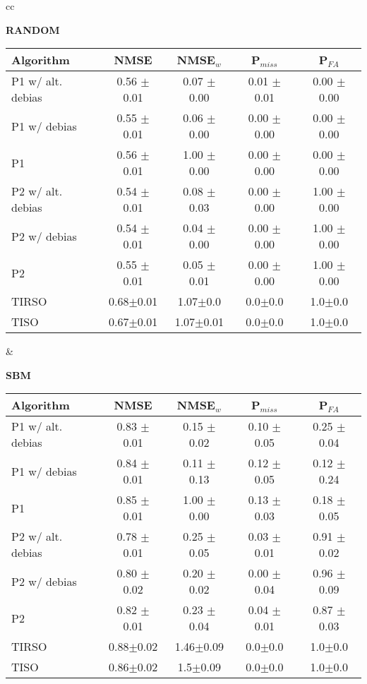 \begin{table}[htbp]
\begin{tabular}{cc}
\begin{minipage}{0.48\textwidth}
\centering
\textbf{RANDOM}
\begin{tabular}{lcccc}
\toprule
Algorithm & NMSE & NMSE$_w$ & P$_{miss}$ & P$_{FA}$ \\
\midrule
P1 w/ alt. debias & 0.56 $\pm$ 0.01 & 0.07 $\pm$ 0.00 & 0.01 $\pm$ 0.01 & 0.00 $\pm$ 0.00 \\
P1 w/ debias & 0.55 $\pm$ 0.01 & 0.06 $\pm$ 0.00 & 0.00 $\pm$ 0.00 & 0.00 $\pm$ 0.00 \\
P1 & 0.56 $\pm$ 0.01 & 1.00 $\pm$ 0.00 & 0.00 $\pm$ 0.00 & 0.00 $\pm$ 0.00 \\
P2 w/ alt. debias & 0.54 $\pm$ 0.01 & 0.08 $\pm$ 0.03 & 0.00 $\pm$ 0.00 & 1.00 $\pm$ 0.00 \\
P2 w/ debias & 0.54 $\pm$ 0.01 & 0.04 $\pm$ 0.00 & 0.00 $\pm$ 0.00 & 1.00 $\pm$ 0.00 \\
P2 & 0.55 $\pm$ 0.01 & 0.05 $\pm$ 0.01 & 0.00 $\pm$ 0.00 & 1.00 $\pm$ 0.00 \\
TIRSO & 0.68{\tiny$\pm$0.01} & 1.07{\tiny$\pm$0.0} & 0.0{\tiny$\pm$0.0} & 1.0{\tiny$\pm$0.0} \\
TISO & 0.67{\tiny$\pm$0.01} & 1.07{\tiny$\pm$0.01} & 0.0{\tiny$\pm$0.0} & 1.0{\tiny$\pm$0.0} \\
\bottomrule
\end{tabular}
\end{minipage}
&
\begin{minipage}{0.48\textwidth}
\centering
\textbf{SBM}
\begin{tabular}{lcccc}
\toprule
Algorithm & NMSE & NMSE$_w$ & P$_{miss}$ & P$_{FA}$ \\
\midrule
P1 w/ alt. debias & 0.83 $\pm$ 0.01 & 0.15 $\pm$ 0.02 & 0.10 $\pm$ 0.05 & 0.25 $\pm$ 0.04 \\
P1 w/ debias & 0.84 $\pm$ 0.01 & 0.11 $\pm$ 0.13 & 0.12 $\pm$ 0.05 & 0.12 $\pm$ 0.24 \\
P1 & 0.85 $\pm$ 0.01 & 1.00 $\pm$ 0.00 & 0.13 $\pm$ 0.03 & 0.18 $\pm$ 0.05 \\
P2 w/ alt. debias & 0.78 $\pm$ 0.01 & 0.25 $\pm$ 0.05 & 0.03 $\pm$ 0.01 & 0.91 $\pm$ 0.02 \\
P2 w/ debias & 0.80 $\pm$ 0.02 & 0.20 $\pm$ 0.02 & 0.00 $\pm$ 0.04 & 0.96 $\pm$ 0.09 \\
P2 & 0.82 $\pm$ 0.01 & 0.23 $\pm$ 0.04 & 0.04 $\pm$ 0.01 & 0.87 $\pm$ 0.03 \\
TIRSO & 0.88{\tiny$\pm$0.02} & 1.46{\tiny$\pm$0.09} & 0.0{\tiny$\pm$0.0} & 1.0{\tiny$\pm$0.0} \\
TISO & 0.86{\tiny$\pm$0.02} & 1.5{\tiny$\pm$0.09} & 0.0{\tiny$\pm$0.0} & 1.0{\tiny$\pm$0.0} \\
\bottomrule
\end{tabular}
\end{minipage}
\end{tabular}
\end{table}
